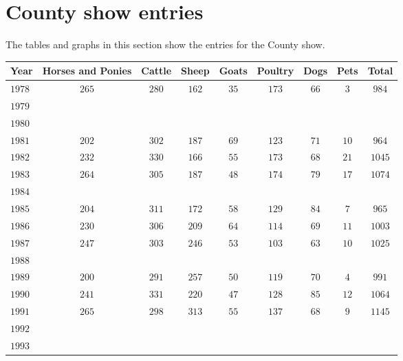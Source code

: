 \section*{County show entries}
The tables and graphs in this section show the entries for the County show.


\begin{longtable}{|l|cccccccc|}
\hline
    \textbf{Year} &
    \textbf{Horses and Ponies} &
    \textbf{Cattle} &
    \textbf{Sheep} &
    \textbf{Goats} &
    \textbf{Poultry} &
    \textbf{Dogs} &
    \textbf{Pets} &
    \textbf{Total}    
    \\
\hline
\endhead
\hline
\endfoot
    $1978$  & $265$ & $280$ & $162$ & $35$  & $173$ & $66$  & $3$   & $984$ \\
    $1979$  &       &       &       &       &       &       &       &       \\
    $1980$  &       &       &       &       &       &       &       &       \\
    $1981$  & $202$ & $302$ & $187$ & $69$  & $123$ & $71$  & $10$  & $964$ \\
    $1982$  & $232$ & $330$ & $166$ & $55$  & $173$ & $68$  & $21$  & $1045$\\
    $1983$  & $264$ & $305$ & $187$ & $48$  & $174$ & $79$  & $17$  & $1074$\\
    $1984$  &       &       &       &       &       &       &       &       \\
    $1985$  & $204$ & $311$ & $172$ & $58$  & $129$ & $84$  & $7$   & $965$ \\
    $1986$  & $230$ & $306$ & $209$ & $64$  & $114$ & $69$  & $11$  & $1003$ \\
    $1987$  & $247$ & $303$ & $246$ & $53$  & $103$ & $63$  & $10$  & $1025$ \\
    $1988$  &       &       &       &       &       &       &       &       \\
    $1989$  & $200$ & $291$ & $257$ & $50$  & $119$ & $70$  & $4$   & $991$ \\
    $1990$  & $241$ & $331$ & $220$ & $47$  & $128$ & $85$  & $12$  & $1064$ \\
    $1991$  & $265$ & $298$ & $313$ & $55$  & $137$ & $68$  & $9$   & $1145$ \\
    $1992$  &       &       &       &       &       &       &       &       \\
    $1993$  &       &       &       &       &       &       &       &       \\

\end{longtable}
